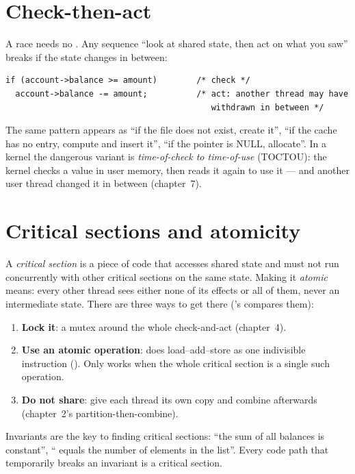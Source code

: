 \section{Check-then-act}

A race needs no \code{++}. Any sequence ``look at shared state, then act
on what you saw'' breaks if the state changes in between:

\begin{lstlisting}
if (account->balance >= amount)        /* check */
  account->balance -= amount;          /* act: another thread may have
                                          withdrawn in between */
\end{lstlisting}

The same pattern appears as ``if the file does not exist, create it'',
``if the cache has no entry, compute and insert it'', ``if the pointer is
NULL, allocate''. In a kernel the dangerous variant is
\emph{time-of-check to time-of-use} (TOCTOU): the kernel checks a value in
user memory, then reads it again to use it --- and another user thread
changed it in between (chapter~7).

\section{Critical sections and atomicity}

A \emph{critical section} is a piece of code that accesses shared state
and must not run concurrently with other critical sections on the same
state. Making it \emph{atomic} means: every other thread sees either none
of its effects or all of them, never an intermediate state. There are
three ways to get there ('s  compares
them):

\begin{enumerate}
  \item \textbf{Lock it}: a mutex around the whole check-and-act
    (chapter~4).
  \item \textbf{Use an atomic operation}:  does
    load--add--store as one indivisible instruction ().
    Only works when the whole critical section is a single such operation.
  \item \textbf{Do not share}: give each thread its own copy and combine
    afterwards (chapter~2's partition-then-combine).
\end{enumerate}

Invariants are the key to finding critical sections: ``the sum of all
balances is constant'', `` equals the number of elements in
the list''. Every code path that temporarily breaks an invariant is a
critical section.

